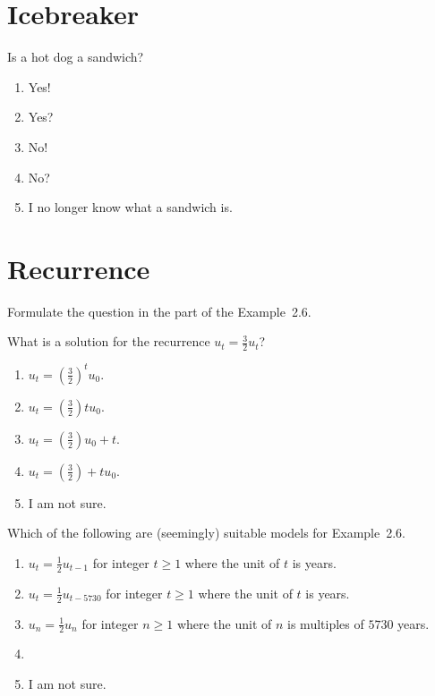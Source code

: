 \documentclass[t, 14pt]{beamer}
\begin{document}
\section{Icebreaker}

\begin{frame}
  Is a hot dog a sandwich?
  
  \medskip
  \begin{enumerate} 
    \item Yes!
    \item Yes?
    \item No!
    \item No?
    \item I no longer know what a sandwich is.
  \end{enumerate} 
\end{frame}


\section{Recurrence}

\begin{frame}
  Formulate the question in the \faComment{} part of the Example~2.6.
\end{frame}

\begin{frame}
  What is a solution for the recurrence \(u_{t} = \frac{3}{2} u_{t}\)?
  \begin{enumerate}
    \item \(u_{t} = \left( \tfrac{3}{2} \right)^{t} u_{0}\).
    \item \(u_{t} = \left( \tfrac{3}{2} \right)t u_{0}\).
    \item \(u_{t} = \left( \tfrac{3}{2} \right)u_{0} + t\).
    \item \(u_{t} = \left( \tfrac{3}{2} \right) + t u_{0}\).
    \item I am not sure.
  \end{enumerate}
\end{frame}

\begin{frame}
  Which of the following are (seemingly) suitable models for Example~2.6.

  \begin{enumerate}
    \item \(u_{t} = \frac{1}{2} u_{t-1}\) for integer \(t \ge 1\) where the unit of \(t\) is years.
    \item \(u_{t} = \frac{1}{2} u_{t - 5730}\) for integer \(t \ge 1\) where the unit of \(t\) is years.
    \item \(u_{n} = \frac{1}{2} u_{n}\) for integer \(n \ge 1\) where the unit of \(n\) is multiples of \(5730\) years.
    \item 
    \item I am not sure. 
  \end{enumerate}
\end{frame}
\end{document}
